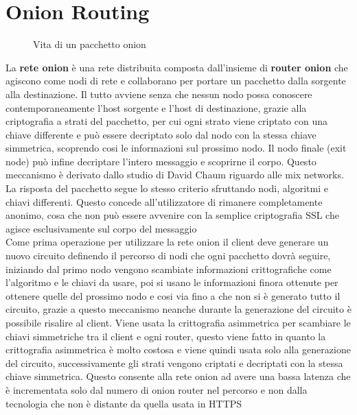 \chapter{Onion Routing}
\label{chap:Capitolo1}

\begin{figure}[htpb!]
    \centering
    
    \caption{Vita di un pacchetto onion}
    \label{fig:routing}
\end{figure}

La \textbf{rete onion} è una rete distribuita composta dall'insieme di \textbf{router onion} che agiscono come nodi di rete e collaborano per portare un pacchetto dalla sorgente alla destinazione. Il tutto avviene senza che nessun nodo possa conoscere contemporaneamente l'host sorgente e l'host di destinazione, grazie alla criptografia a strati del pacchetto, per cui ogni strato viene criptato con una chiave differente e può essere decriptato solo dal nodo con la stessa chiave simmetrica, scoprendo cosi le informazioni sul prossimo nodo. Il nodo finale (exit node) può infine decriptare l'intero messaggio e scoprirne il corpo. Questo meccanismo è derivato dallo studio di David Chaum riguardo alle mix networks. La risposta del pacchetto segue lo stesso criterio sfruttando nodi, algoritmi e chiavi differenti. Questo concede all'utilizzatore di rimanere completamente anonimo, cosa che non può essere avvenire con la semplice criptografia SSL che agisce esclusivamente sul corpo del messaggio \\
Come prima operazione per utilizzare la rete onion il client deve generare un nuovo circuito definendo il percorso di nodi che ogni pacchetto dovrà seguire, iniziando dal primo nodo vengono scambiate informazioni crittografiche come l'algoritmo e le chiavi da usare, poi si usano le informazioni finora ottenute per ottenere quelle del prossimo nodo e cosi via fino a che non si è generato tutto il circuito, grazie a questo meccanismo neanche durante la generazione del circuito è possibile risalire al client. Viene usata la crittografia asimmetrica per scambiare le chiavi simmetriche tra il client e ogni router, questo viene fatto in quanto la crittografia asimmetrica è molto costosa e viene quindi usata solo alla generazione del circuito, successivamente gli strati vengono criptati e decriptati con la stessa chiave simmetrica. Questo consente alla rete onion ad avere una bassa latenza che è incrementata solo dal numero di onion router nel percorso e non dalla tecnologia che non è distante da quella usata in HTTPS 
\cite{OnionRouting}

